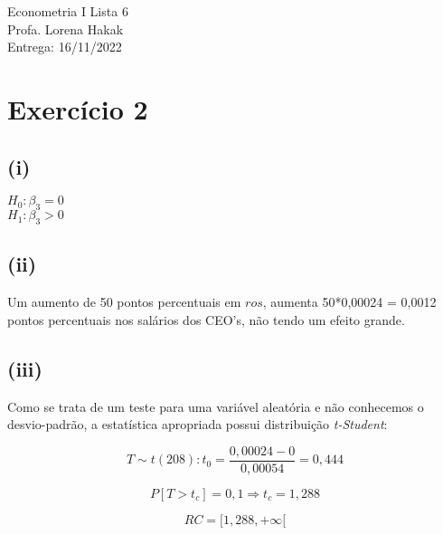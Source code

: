 \documentclass[hidelinks,11pt]{book}
\theoremstyle{definition}
\begin{document}
	
	\begin{center}
		{\Large Econometria I \hspace{0.5cm} Lista 6}\\
		Profa. Lorena Hakak\\
		Entrega: 16/11/2022
	\end{center}
	
	\vspace{0.2 cm}
	
	
	
\section*{Exercício 2}

\subsection*{(i)}

\begin{center}
	$H_0 : \beta_{3} = 0$\\
	$H_1 : \beta_{3} > 0$
\end{center}

\subsection*{(ii)}

Um aumento de 50 pontos percentuais em $ros$, aumenta 50*0,00024 = 0,0012 pontos percentuais nos salários dos CEO's, não tendo um efeito grande.

\subsection*{(iii)}

Como se trata de um teste para uma variável aleatória e não conhecemos o desvio-padrão, a estatística apropriada possui distribuição \textit{t-Student}:

\begin{displaymath}
	T \sim t(208): t_0 = \frac{0,00024 - 0} {0,00054} = 0,444
\end{displaymath}

\begin{displaymath}
	P[T > t_c ] = 0,1 \Rightarrow t_c = 1,288
\end{displaymath}

\begin{displaymath}
	RC = [1,288, +\infty[
\end{displaymath}
\end{document}
